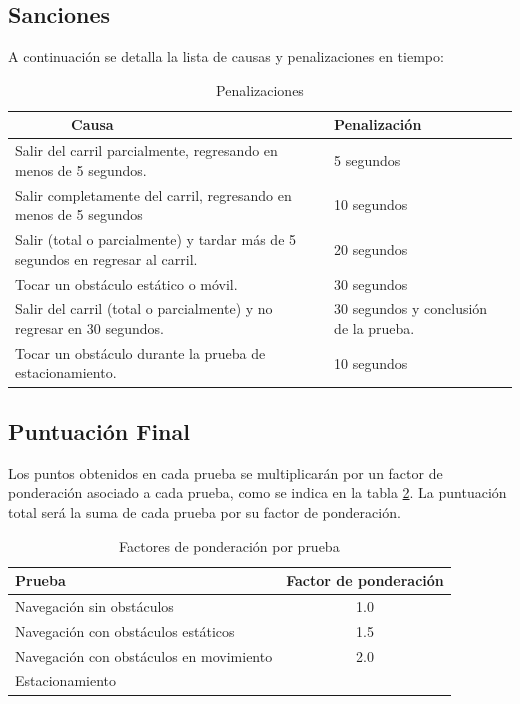 \documentclass[letterpaper,12pt]{article}
\begin{document}
\subsection{Sanciones}
\label{sec:penalties}
A continuación se detalla la lista de causas y penalizaciones en tiempo:
\begin{table}[h!]
  \centering
  \begin{tabular}{|p{}|p{}|}
    \hline
    $\qquad\qquad$Causa & Penalización\\
    \hline
    Salir del carril parcialmente, regresando en menos de 5 segundos. & 5 segundos\\
    \hline
    Salir completamente del carril, regresando en menos de 5 segundos & 10 segundos\\
    \hline
    Salir (total o parcialmente) y tardar más de 5 segundos en regresar al carril. & 20 segundos\\
    \hline
    Tocar un obstáculo estático o móvil. & 30 segundos\\
    \hline
    Salir del carril (total o parcialmente) y no regresar en 30 segundos.  & 30 segundos y conclusión de la prueba.\\
    \hline
    Tocar un obstáculo durante la prueba de estacionamiento. & 10 segundos\\
    \hline
  \end{tabular}
  \caption{Penalizaciones}
  \label{tab:Penalties}
\end{table}

\subsection{Puntuación Final}
\label{sec:final_score}
Los puntos obtenidos en cada prueba se multiplicarán por un factor de ponderación asociado a cada prueba, como se indica en la tabla \ref{tab:weights}. La puntuación total será la suma de cada prueba por su factor de ponderación.

\begin{table}[h!]
  \centering
  \begin{tabular}{|l|c|}
    \hline
    Prueba & Factor de ponderación\\
    \hline
    Navegación sin obstáculos & 1.0 \\
    \hline
    Navegación con obstáculos estáticos & 1.5 \\
    \hline
    Navegación con obstáculos en movimiento & 2.0 \\
    \hline
    Estacionamiento\\
    \hline
  \end{tabular}
  \caption{Factores de ponderación por prueba}
  \label{tab:weights}
\end{table}
\end{document}
